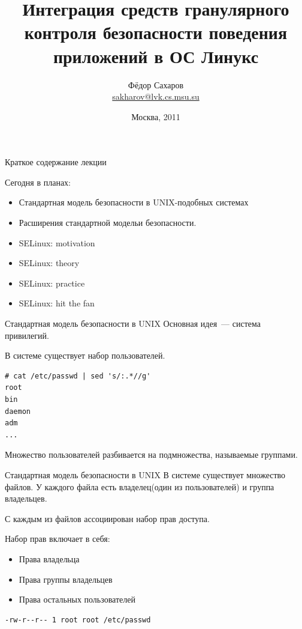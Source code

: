 \documentclass{beamer}
\makeatletter
\def\watermarkoff{\def\beamer@decolines@watermark{}}
\makeatother
\begin{document}
\title{Интеграция средств гранулярного контроля безопасности поведения
        приложений в ОС Линукс}  
\author{\small{Фёдор Сахаров}\\ \small{\href{mailto:sakharov@lvk.cs.msu.su}{sakharov@lvk.cs.msu.su}}}
\date{Москва, 2011} 
\begin{frame}[t, plain] 
\watermarkoff
 \titlepage
\end{frame}

\begin{frame}{Краткое содержание лекции}
\watermarkoff
\begin{block}{Сегодня в планах:}
 \begin{itemize}
  \item Стандартная модель безопасности в UNIX-подобных системах
  \item Расширения стандартной модельи безопасности.
  \item SELinux: motivation
  \item SELinux: theory
  \item SELinux: practice
  \item SELinux: hit the fan
 \end{itemize}
\end{block}
\end{frame}

\begin{frame}[fragile]{Стандартная модель безопасности в UNIX}
Основная идея~--- система привилегий.
\bigskip

В системе существует набор пользователей.
\bigskip
\begin{lstlisting}
# cat /etc/passwd | sed 's/:.*//g'
root
bin
daemon
adm
...
\end{lstlisting}

Множество пользователей разбивается на подмножества,
называемые группами.
\end{frame}


\begin{frame}[fragile]{Стандартная модель безопасности в UNIX}
В системе существует множество файлов.
У каждого файла есть владелец(один из пользователей)
и группа владельцев.

\bigskip
С каждым из файлов ассоциирован набор прав доступа.

\begin{block}{Набор прав включает в себя:}
\begin{itemize}
\item Права владельца
\item Права группы владельцев
\item Права остальных пользователей
\end{itemize}
\end{block}

\begin{lstlisting}
-rw-r--r-- 1 root root /etc/passwd
\end{lstlisting}

\end{frame}
\end{document}
